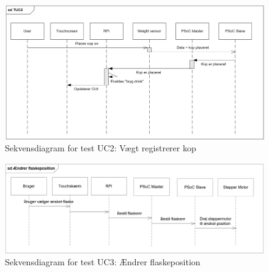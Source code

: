 \begin{figure}[H]
	\centering
	\includegraphics[width=1\textwidth]{Images/TUC2.png}
	\caption{Sekvensdiagram for test UC2: Vægt registrerer kop}
	\label{fig:testUC2}
\end{figure}

\begin{figure}[H]
	\centering
	\includegraphics[width=1\textwidth]{Images/sdTestUC3.png}
	\caption{Sekvensdiagram for test UC3: Ændrer flaskeposition}
	\label{fig:testUC3}
\end{figure}

